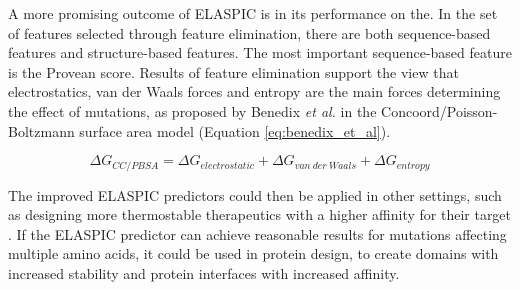 A more promising outcome of ELASPIC is in its performance on the. In the set of features selected through feature elimination, there are both sequence-based features and structure-based features. The most important sequence-based feature is the Provean score. Results of feature elimination support the view that electrostatics, van der Waals forces and entropy are the main forces determining the effect of mutations, as proposed by Benedix \textit{et al.} in the Concoord/Poisson-Boltzmann surface area model (Equation \ref{eq:benedix_et_al}).

\begin{equation} \label{eq:benedix_et_al}
    \Delta G_{CC/PBSA} = \Delta G_{electrostatic} + \Delta G_{van\ der\ Waals} + \Delta G_{entropy}
\end{equation}



The improved ELASPIC predictors could then be applied in other settings, such as designing more thermostable therapeutics with a higher affinity for their target \cite{seeliger_protein_2010,bednar_fireprot:_2015}. If the ELASPIC predictor can achieve reasonable results for mutations affecting multiple amino acids, it could be used in protein design, to create domains with increased stability and protein interfaces with increased affinity.
